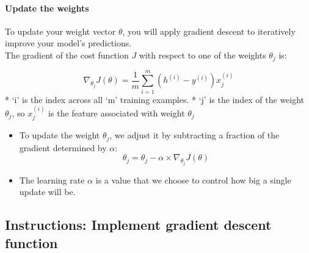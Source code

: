 \documentclass[11pt]{article}
\providecommand{\tightlist}{%
      \setlength{\itemsep}{0pt}\setlength{\parskip}{0pt}}
\begin{document}
    \hypertarget{update-the-weights}{%
\paragraph{Update the weights}\label{update-the-weights}}

To update your weight vector \(\theta\), you will apply gradient descent
to iteratively improve your model's predictions.\\
The gradient of the cost function \(J\) with respect to one of the
weights \(\theta_j\) is:

\[\nabla_{\theta_j}J(\theta) = \frac{1}{m} \sum_{i=1}^m(h^{(i)}-y^{(i)})x^{(i)}_j \tag{5}\]
* `i' is the index across all `m' training examples. * `j' is the index
of the weight \(\theta_j\), so \(x^{(i)}_j\) is the feature associated
with weight \(\theta_j\)

\begin{itemize}
\tightlist
\item
  To update the weight \(\theta_j\), we adjust it by subtracting a
  fraction of the gradient determined by \(\alpha\):
  \[\theta_j = \theta_j - \alpha \times \nabla_{\theta_j}J(\theta) \]
\item
  The learning rate \(\alpha\) is a value that we choose to control how
  big a single update will be.
\end{itemize}

    \hypertarget{instructions-implement-gradient-descent-function}{%
\subsection{Instructions: Implement gradient descent
function}\label{instructions-implement-gradient-descent-function}}
\end{document}
